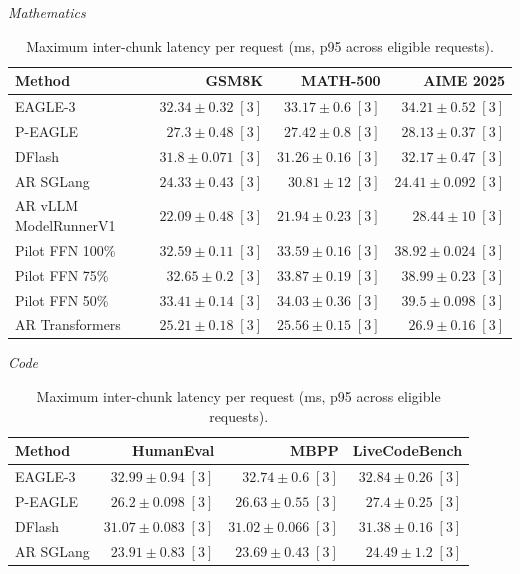 \begin{table}[!htp]
\centering\small
\setlength{\tabcolsep}{3pt}
\caption{Maximum inter-chunk latency per request (ms, p95 across eligible requests).}
\label{tab:appendix-metric-pause-none}
\textit{Mathematics}\par\smallskip
\begin{tabular}{@{}>{\raggedright\arraybackslash}p{3.7cm}rrr@{}}
\toprule
Method & GSM8K & MATH-500 & AIME 2025 \\
\midrule
EAGLE-3 & \(32.34 \pm 0.32\;[3]\) & \(33.17 \pm 0.6\;[3]\) & \(34.21 \pm 0.52\;[3]\) \\
P-EAGLE & \(27.3 \pm 0.48\;[3]\) & \(27.42 \pm 0.8\;[3]\) & \(28.13 \pm 0.37\;[3]\) \\
DFlash & \(31.8 \pm 0.071\;[3]\) & \(31.26 \pm 0.16\;[3]\) & \(32.17 \pm 0.47\;[3]\) \\
AR \textperiodcentered{} SGLang & \(24.33 \pm 0.43\;[3]\) & \(30.81 \pm 12\;[3]\) & \(\mathbf{24.41} \pm 0.092\;[3]\) \\
AR \textperiodcentered{} vLLM ModelRunnerV1 & \(\mathbf{22.09} \pm 0.48\;[3]\) & \(\mathbf{21.94} \pm 0.23\;[3]\) & \(28.44 \pm 10\;[3]\) \\
Pilot FFN 100\% & \(32.59 \pm 0.11\;[3]\) & \(33.59 \pm 0.16\;[3]\) & \(38.92 \pm 0.024\;[3]\) \\
Pilot FFN 75\% & \(32.65 \pm 0.2\;[3]\) & \(33.87 \pm 0.19\;[3]\) & \(38.99 \pm 0.23\;[3]\) \\
Pilot FFN 50\% & \(33.41 \pm 0.14\;[3]\) & \(34.03 \pm 0.36\;[3]\) & \(39.5 \pm 0.098\;[3]\) \\
AR \textperiodcentered{} Transformers & \(25.21 \pm 0.18\;[3]\) & \(25.56 \pm 0.15\;[3]\) & \(26.9 \pm 0.16\;[3]\) \\
\bottomrule
\end{tabular}\par\medskip
\textit{Code}\par\smallskip
\begin{tabular}{@{}>{\raggedright\arraybackslash}p{3.7cm}rrr@{}}
\toprule
Method & HumanEval & MBPP & LiveCodeBench \\
\midrule
EAGLE-3 & \(32.99 \pm 0.94\;[3]\) & \(32.74 \pm 0.6\;[3]\) & \(32.84 \pm 0.26\;[3]\) \\
P-EAGLE & \(26.2 \pm 0.098\;[3]\) & \(26.63 \pm 0.55\;[3]\) & \(27.4 \pm 0.25\;[3]\) \\
DFlash & \(31.07 \pm 0.083\;[3]\) & \(31.02 \pm 0.066\;[3]\) & \(31.38 \pm 0.16\;[3]\) \\
AR \textperiodcentered{} SGLang & \(23.91 \pm 0.83\;[3]\) & \(23.69 \pm 0.43\;[3]\) & \(24.49 \pm 1.2\;[3]\) \\

\end{tabular}
\end{table}
